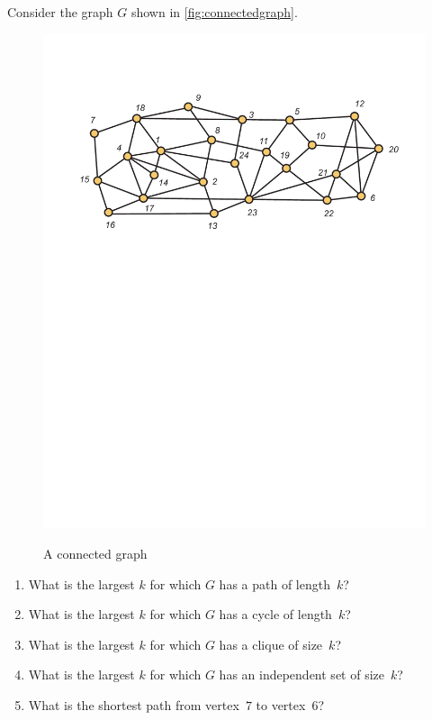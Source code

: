 \begin{example}
Consider the graph $G$ shown in \autoref{fig:connectedgraph}.

\begin{figure}
\begin{center}
\includegraphics[viewport=55 462 575 702, scale=.6]{intro-figs/3012-fig17}\\
\caption{A connected graph}
\label{fig:connectedgraph}
\end{center}
\end{figure}

\begin{enumerate}
\item What is the largest $k$ for which $G$ has a path
of length~$k$? 
\item What is the largest $k$ for which $G$ has a cycle 
of length~$k$? 
\item What is the largest $k$ for which $G$ has a clique
of size~$k$? 
\item What is the largest $k$ for which $G$ has an
independent set of size~$k$? 
\item  What is the shortest path from vertex~$7$ to
vertex~$6$?
\end{enumerate}


\end{example}
